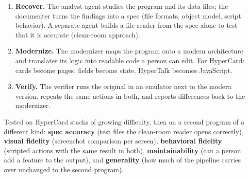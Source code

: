 \documentclass[10pt]{article}
\newcommand{\sect}[1]{\vspace{3pt}{\large\bfseries #1}\par\vspace{1pt}}
\begin{document}
\begin{center}
\end{center}

\begin{enumerate}[label=\textbf{\arabic*.}]
  \item \textbf{Recover.} The analyst agent studies the program and its data files; the documenter
  turns the findings into a spec (file formats, object model, script behavior). A separate agent
  builds a file reader from the spec alone to test that it is accurate (clean-room approach).
  \item \textbf{Modernize.} The modernizer maps the program onto a modern architecture and translates
  its logic into readable code a person can edit. For HyperCard: cards become pages, fields become
  state, HyperTalk becomes JavaScript.
  \item \textbf{Verify.} The verifier runs the original in an emulator next to the modern version,
  repeats the same actions in both, and reports differences back to the modernizer.
\end{enumerate}

\sect{Evaluation}
Tested on HyperCard stacks of growing difficulty, then on a second program of a different kind:
\textbf{spec accuracy} (test files the clean-room reader opens correctly), \textbf{visual fidelity}
(screenshot comparison per screen), \textbf{behavioral fidelity} (scripted actions with the same
result in both), \textbf{maintainability} (can a person add a feature to the output), and
\textbf{generality} (how much of the pipeline carries over unchanged to the second program).
\end{document}
